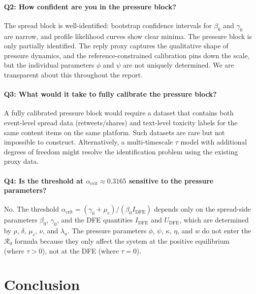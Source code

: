 \documentclass[11pt]{article}
\begin{document}
\paragraph{Q2: How confident are you in the pressure block?}
The spread block is well-identified: bootstrap confidence intervals for $\beta_0$ and $\gamma_0$ are narrow, and profile likelihood curves show clear minima. The pressure block is only partially identified. The reply proxy captures the qualitative shape of pressure dynamics, and the reference-constrained calibration pins down the scale, but the individual parameters $\phi$ and $\psi$ are not uniquely determined. We are transparent about this throughout the report.

\paragraph{Q3: What would it take to fully calibrate the pressure block?}
A fully calibrated pressure block would require a dataset that contains both event-level spread data (retweets/shares) and text-level toxicity labels for the same content items on the same platform. Such datasets are rare but not impossible to construct. Alternatively, a multi-timescale $\tau$ model with additional degrees of freedom might resolve the identification problem using the existing proxy data.

\paragraph{Q4: Is the threshold at $\alpha_{\mathrm{crit}} \approx 0.3165$ sensitive to the pressure parameters?}
No. The threshold $\alpha_{\mathrm{crit}} = (\gamma_0 + \mu_c)/(\beta_0 I_{\mathrm{DFE}})$ depends only on the spread-side parameters $\beta_0$, $\gamma_0$, and the DFE quantities $I_{\mathrm{DFE}}$ and $U_{\mathrm{DFE}}$, which are determined by $\rho$, $\delta$, $\mu_c$, $\nu$, and $\lambda_u$. The pressure parameters $\phi$, $\psi$, $\kappa$, $\eta$, and $w$ do not enter the $\mathcal{R}_0$ formula because they only affect the system at the positive equilibrium (where $\tau > 0$), not at the DFE (where $\tau = 0$).


\section{Conclusion}
\label{sec:conclusion}
\end{document}
